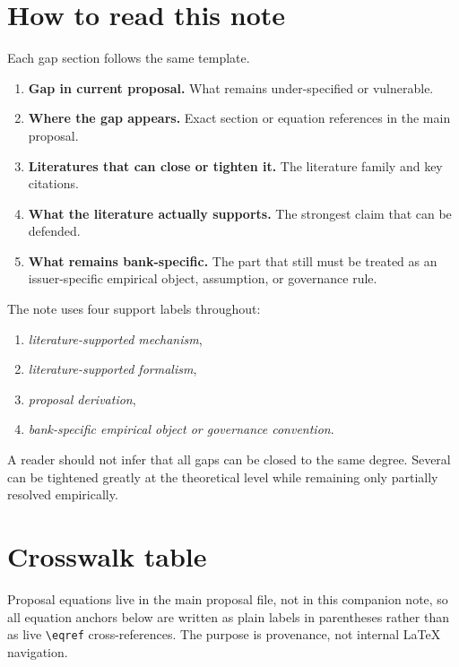 \documentclass[11pt]{article}
\begin{document}
\section{How to read this note}

Each gap section follows the same template.
\begin{enumerate}[label=\arabic*.]
  \item \textbf{Gap in current proposal.} What remains under-specified or
        vulnerable.
  \item \textbf{Where the gap appears.} Exact section or equation references in
        the main proposal.
  \item \textbf{Literatures that can close or tighten it.} The literature family
        and key citations.
  \item \textbf{What the literature actually supports.} The strongest claim that
        can be defended.
  \item \textbf{What remains bank-specific.} The part that still must be treated
        as an issuer-specific empirical object, assumption, or governance rule.
\end{enumerate}

The note uses four support labels throughout:
\begin{enumerate}[label=\arabic*.]
  \item \emph{literature-supported mechanism},
  \item \emph{literature-supported formalism},
  \item \emph{proposal derivation},
  \item \emph{bank-specific empirical object or governance convention}.
\end{enumerate}
A reader should not infer that all gaps can be closed to the same degree.
Several can be tightened greatly at the theoretical level while remaining only
partially resolved empirically.

\section{Crosswalk table}

Proposal equations live in the main proposal file, not in this companion note, so
all equation anchors below are written as plain labels in parentheses rather than
as live \verb|\eqref| cross-references. The purpose is provenance, not internal
LaTeX navigation.
\end{document}
